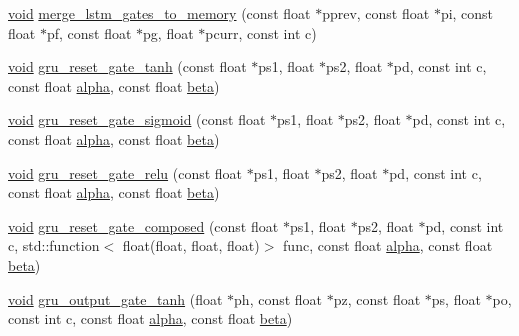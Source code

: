 \begin{DoxyCompactItemize}
\mbox{\hyperlink{mlasi_8h_a88f941d423cb2a819b70a1358982b1a6}{void}} \mbox{\hyperlink{namespaceonnxruntime_1_1rnn_1_1detail_1_1deepcpu_a27d683ef39f7917b5ca03d2d8b0167c3}{merge\+\_\+lstm\+\_\+gates\+\_\+to\+\_\+memory}} (const float $\ast$pprev, const float $\ast$pi, const float $\ast$pf, const float $\ast$pg, float $\ast$pcurr, const int c)
\item 
\mbox{\hyperlink{mlasi_8h_a88f941d423cb2a819b70a1358982b1a6}{void}} \mbox{\hyperlink{namespaceonnxruntime_1_1rnn_1_1detail_1_1deepcpu_a1af846c78baadc9451b56bc1c515d679}{gru\+\_\+reset\+\_\+gate\+\_\+tanh}} (const float $\ast$ps1, float $\ast$ps2, float $\ast$pd, const int c, const float \mbox{\hyperlink{mlasi_8h_a1763355f32e1812e5cb3a0080e7cca12}{alpha}}, const float \mbox{\hyperlink{mlasi_8h_a5fd37d216981b4cd9a19e29b5acd48d4}{beta}})
\item 
\mbox{\hyperlink{mlasi_8h_a88f941d423cb2a819b70a1358982b1a6}{void}} \mbox{\hyperlink{namespaceonnxruntime_1_1rnn_1_1detail_1_1deepcpu_a1b4d38d57effefd3a8c1566e5f3495bc}{gru\+\_\+reset\+\_\+gate\+\_\+sigmoid}} (const float $\ast$ps1, float $\ast$ps2, float $\ast$pd, const int c, const float \mbox{\hyperlink{mlasi_8h_a1763355f32e1812e5cb3a0080e7cca12}{alpha}}, const float \mbox{\hyperlink{mlasi_8h_a5fd37d216981b4cd9a19e29b5acd48d4}{beta}})
\item 
\mbox{\hyperlink{mlasi_8h_a88f941d423cb2a819b70a1358982b1a6}{void}} \mbox{\hyperlink{namespaceonnxruntime_1_1rnn_1_1detail_1_1deepcpu_ad5420f147be377034238001dd54dcedb}{gru\+\_\+reset\+\_\+gate\+\_\+relu}} (const float $\ast$ps1, float $\ast$ps2, float $\ast$pd, const int c, const float \mbox{\hyperlink{mlasi_8h_a1763355f32e1812e5cb3a0080e7cca12}{alpha}}, const float \mbox{\hyperlink{mlasi_8h_a5fd37d216981b4cd9a19e29b5acd48d4}{beta}})
\item 
\mbox{\hyperlink{mlasi_8h_a88f941d423cb2a819b70a1358982b1a6}{void}} \mbox{\hyperlink{namespaceonnxruntime_1_1rnn_1_1detail_1_1deepcpu_abfd832861f6bbba6a17be29e3150438b}{gru\+\_\+reset\+\_\+gate\+\_\+composed}} (const float $\ast$ps1, float $\ast$ps2, float $\ast$pd, const int c, std\+::function$<$ float(float, float, float)$>$ func, const float \mbox{\hyperlink{mlasi_8h_a1763355f32e1812e5cb3a0080e7cca12}{alpha}}, const float \mbox{\hyperlink{mlasi_8h_a5fd37d216981b4cd9a19e29b5acd48d4}{beta}})
\item 
\mbox{\hyperlink{mlasi_8h_a88f941d423cb2a819b70a1358982b1a6}{void}} \mbox{\hyperlink{namespaceonnxruntime_1_1rnn_1_1detail_1_1deepcpu_a8b6250d6233998108f91689c51fde355}{gru\+\_\+output\+\_\+gate\+\_\+tanh}} (float $\ast$ph, const float $\ast$pz, const float $\ast$ps, float $\ast$po, const int c, const float \mbox{\hyperlink{mlasi_8h_a1763355f32e1812e5cb3a0080e7cca12}{alpha}}, const float \mbox{\hyperlink{mlasi_8h_a5fd37d216981b4cd9a19e29b5acd48d4}{beta}})

\end{DoxyCompactItemize}
